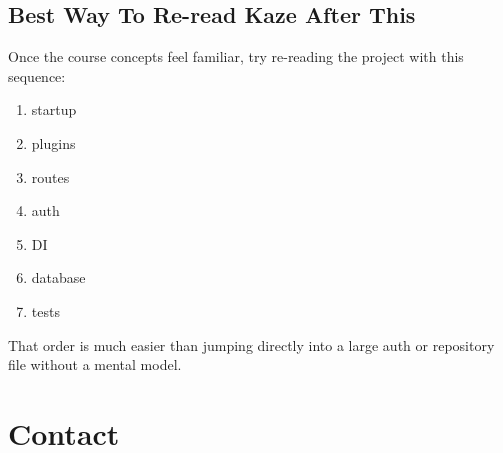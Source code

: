 \documentclass[11pt,a4paper]{article}
\begin{document}
\subsection{Best Way To Re-read Kaze After This}

Once the course concepts feel familiar, try re-reading the project with this sequence:
\begin{enumerate}
    \item startup
    \item plugins
    \item routes
    \item auth
    \item DI
    \item database
    \item tests
\end{enumerate}

That order is much easier than jumping directly into a large auth or repository file without a mental model.

\section{Contact}

\KazeContactBlock
\end{document}
